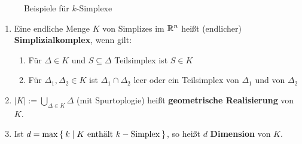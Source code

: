 \begin{figure}[ht]
    \centering

    \label{fig:k-simplexe}
    \caption{Beispiele für $k$-Simplexe}
\end{figure}


\begin{definition}
    \begin{enumerate}[label=\alph*),ref=\theplaindefinition.\alph*]
        \item Eine endliche Menge $K$ von Simplizes im $\mathbb{R}^n$
              heißt (endlicher) \textbf{Simplizialkomplex},
              wenn gilt:
            \begin{enumerate}[label=(\roman*)]
                \item Für $\Delta \in K$ und $S \subseteq \Delta$ Teilsimplex
                      ist $S \in K$
                \item Für $\Delta_1, \Delta_2 \in K$ ist 
                      $\Delta_1 \cap \Delta_2$ leer
                      oder ein Teilsimplex von $\Delta_1$ und von 
                      $\Delta_2$
            \end{enumerate}
        \item $|K| := \bigcup_{\Delta \in K} \Delta$ (mit Spurtoplogie)
              heißt \textbf{geometrische Realisierung}
              von $K$.
        \item Ist $d = \max \Set{ k | K \text{ enthält } k-\text{Simplex}}$,
              so heißt $d$ \textbf{Dimension} von
              $K$.
    \end{enumerate}
\end{definition}

